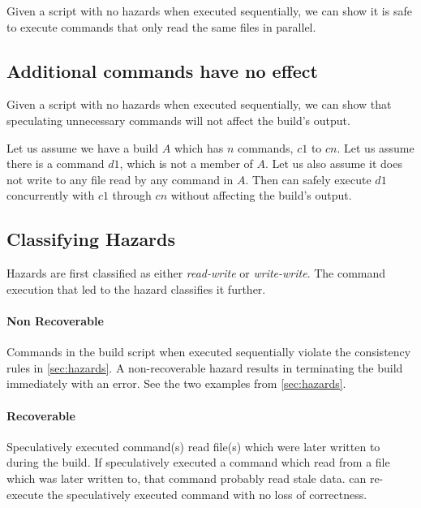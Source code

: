 Given a script with no hazards when executed sequentially, we can show it is safe to execute commands that only read the same files in parallel.



\subsection{Additional commands have no effect}
\label{sec:proof:additional}

Given a script with no hazards when executed sequentially, we can show that speculating unnecessary commands will not affect the build's output. %

Let us assume we have a build $A$ which has $n$ commands, $c1$ to $cn$.  Let us assume there is a command $d1$, which is not a member of $A$.  Let us also assume it does not write to any file read by any command in $A$.  Then \Rattle can safely execute $d1$ concurrently with $c1$ through $cn$ without affecting the build's output.


\subsection{Classifying Hazards}
\label{sec:proof:classify_hazard}

Hazards are first classified as either \emph{read-write} or \emph{write-write}.  The command execution that led to the hazard classifies it further.

\paragraph{Non Recoverable}
Commands in the build script when executed sequentially violate the consistency rules in \ref{sec:hazards}.  A non-recoverable hazard results in \Rattle terminating the build immediately with an error.  See the two examples from \ref{sec:hazards}.


\paragraph{Recoverable}
Speculatively executed command(s) read file(s) which were later written to during the build.  If \Rattle speculatively executed a command which read from a file which was later written to, that command
probably read stale data.  \Rattle can re-execute the speculatively executed command with no loss of correctness.

